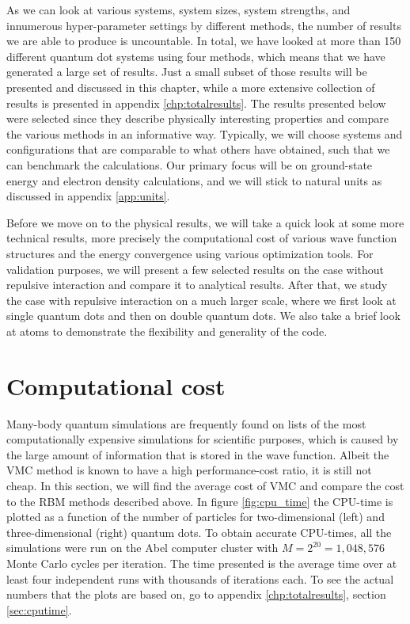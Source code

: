 As we can look at various systems, system sizes, system strengths, and innumerous hyper-parameter settings by different methods, the number of results we are able to produce is uncountable. In total, we have looked at more than 150 different quantum dot systems using four methods, which means that we have generated a large set of results. Just a small subset of those results will be presented and discussed in this chapter, while a more extensive collection of results is presented in appendix \ref{chp:totalresults}. The results presented below were selected since they describe physically interesting properties and compare the various methods in an informative way. Typically, we will choose systems and configurations that are comparable to what others have obtained, such that we can benchmark the calculations. Our primary focus will be on ground-state energy and electron density calculations, and we will stick to natural units as discussed in appendix \ref{app:units}.

Before we move on to the physical results, we will take a quick look at some more technical results, more precisely the computational cost of various wave function structures and the energy convergence using various optimization tools. For validation purposes, we will present a few selected results on the case without repulsive interaction and compare it to analytical results. After that, we study the case with repulsive interaction on a much larger scale, where we first look at single quantum dots and then on double quantum dots. We also take a brief look at atoms to demonstrate the flexibility and generality of the code. 

\section{Computational cost}
Many-body quantum simulations are frequently found on lists of the most computationally expensive simulations for scientific purposes, which is caused by the large amount of information that is stored in the wave function. Albeit the VMC method is known to have a high performance-cost ratio, it is still not cheap. In this section, we will find the average cost of VMC and compare the cost to the RBM methods described above. In figure \eqref{fig:cpu_time} the CPU-time is plotted as a function of the number of particles for two-dimensional (left) and three-dimensional (right) quantum dots. To obtain accurate CPU-times, all the simulations were run on the Abel computer cluster with $M=2^{20}=1,048,576$ Monte Carlo cycles per iteration. The time presented is the average time over at least four independent runs with thousands of iterations each. To see the actual numbers that the plots are based on, go to appendix \ref{chp:totalresults}, section \ref{sec:cputime}. 

